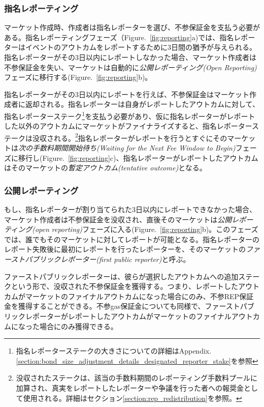 \documentclass[floatfix,reprint,nofootinbib,amsmath,amssymb,epsfig,pre,floats,letterpaper,groupedaffiliation]{revtex4-1}
\theoremstyle{definition}
\theoremstyle{definition}
\theoremstyle{definition}
\begin{document}
\subsubsection{指名レポーティング}

マーケット作成時、作成者は指名レポーターを選び、不参保証金を支払う必要がある。指名レポーティングフェーズ（Figure.~\ref{fig:reporting}a)では、指名レポーターはイベントのアウトカムをレポートするために3日間の猶予が与えられる。指名レポーターがその3日以内にレポートしなかった場合、マーケット作成者は不参保証金を失い、マーケットは自動的に\textit{公開レポーティング(Open Reporting)}フェーズに移行する(Figure.~\ref{fig:reporting}b)。

指名レポーターがその3日以内にレポートを行えば、不参保証金はマーケット作成者に返却される。指名レポーターは自身がレポートしたアウトカムに対して、指名レポーターステーク\footnote{指名レポーターステークの大きさについての詳細はAppendix.\ref{section:bond_size_adjustment_details_designated_reporter_stake}を参照}を支払う必要があり、仮に指名レポーターがレポートした以外のアウトカムにマーケットがファイナライズすると、指名レポーターステークは没収される。\footnote{没収されたステークは、該当の手数料期間のレポーティング手数料プールに加算され、真実をレポートしたレポーターや争議を行った者への報奨金として使用される。詳細はセクション\ref{section:rep_redistribution}を参照。}指名レポーターがレポートを行うとすぐにそのマーケットは\textit{次の手数料期間開始待ち(Waiting for the Next Fee Window to Begin)}フェーズに移行し(Figure.~\ref{fig:reporting}c)、指名レポーターがレポートしたアウトカムはそのマーケットの\textit{暫定アウトカム(tentative outcome)}となる。

\subsubsection{公開レポーティング}\label{section:open_reporting}

もし、指名レポーターが割り当てられた3日以内にレポートできなかった場合、マーケット作成者は不参保証金を没収され、直後そのマーケットは\textit{公開レポーティング(open reporting)}フェーズに入る(Figure.~\ref{fig:reporting}b)。このフェーズでは、誰でもそのマーケットに対してレポートが可能となる。指名レポーターのレポート失敗後に最初にレポートを行ったレポーターを、そのマーケットの\textit{ファーストパブリックレポーター(first public reporter)}と呼ぶ。

ファーストパブリックレポーターは、彼らが選択したアウトカムへの追加ステークという形で、没収された不参保証金を獲得する。つまり、レポートしたアウトカムがマーケットのファイナルアウトカムになった場合にのみ、不参REP保証金を獲得することができる。不参gas保証金についても同様で、ファーストパブリックレポーターがレポートしたアウトカムがマーケットのファイナルアウトカムになった場合にのみ獲得できる。
\end{document}
